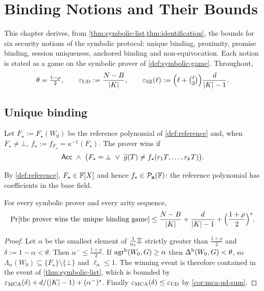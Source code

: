 \chapter{Binding Notions and Their Bounds}
\label{ch:corollaries}

This chapter derives, from \cref{thm:symbolic-list,thm:identification}, the bounds for
six security notions of the symbolic protocol: unique binding, proximity, promise
binding, session uniqueness, anchored binding and non-equivocation. Each notion is stated as a game on
the symbolic prover of \cref{def:symbolic-game}. Throughout,
\[
\theta=\tfrac{1-\rho}2,\qquad
\varepsilon_{\mathrm{UD}}:=\frac{N-B}{|K|},\qquad
\varepsilon_{\mathrm{SZ}}(\ell):=\Bigl(\ell+\tbinom{\ell}2\Bigr)\frac{d}{|K|-1}.
\]

\section{Unique binding}

\begin{definition}\label{def:game-A}
Let $F_\star:=F_\star(W_0)$ be the reference polynomial of \cref{def:reference} and,
when $F_\star\ne\bot$, $f_\star:=f_{F_\star}=\kappa^{-1}(F_\star)$. The prover wins if
\[
\Acc\ \wedge\ \bigl(F_\star=\bot\ \vee\ \gt(T)\ne f_\star(r_1T,\dots,r_kT)\bigr).
\]
\end{definition}

By \cref{def:reference}, $F_\star\in\mathbb{F}[X]$ and hence $f_\star\in\mathcal{P}_{\mathbf a}(\mathbb{F})$: the reference
polynomial has coefficients in the base field.

\begin{theorem}\label{thm:unique-binding}
For every symbolic prover and every arity sequence,
\[
\Pr[\text{the prover wins the unique binding game}]
\le\frac{N-B}{|K|}+\frac{d}{|K|-1}+\Bigl(\frac{1+\rho}2\Bigr)^{s}.
\]
\end{theorem}

\begin{proof}
Let $\alpha$ be the smallest element of $\frac1{n_1}\mathbb{Z}$ strictly greater than
$\frac{1+\rho}2$ and $\delta:=1-\alpha<\theta$. Then $\alpha^-\le\frac{1+\rho}2$. If
$\mathrm{agr}^{\mathrm{b}}(W_0,G)\ge\alpha$ then $\Delta^{\mathrm{b}}(W_0,G)<\theta$, so
$\Lambda_\alpha(W_0)\subseteq\{F_\star\}\setminus\{\bot\}$ and $\ell_\alpha\le1$. The
winning event is therefore contained in the event of \cref{thm:symbolic-list}, which is
bounded by $\varepsilon_{\mathrm{MCA}}(\delta)+d/(|K|-1)+(\alpha^-)^s$. Finally
$\varepsilon_{\mathrm{MCA}}(\delta)\le\varepsilon_{\mathrm{UD}}$ by \cref{cor:mca-ud-sum}.
\end{proof}

